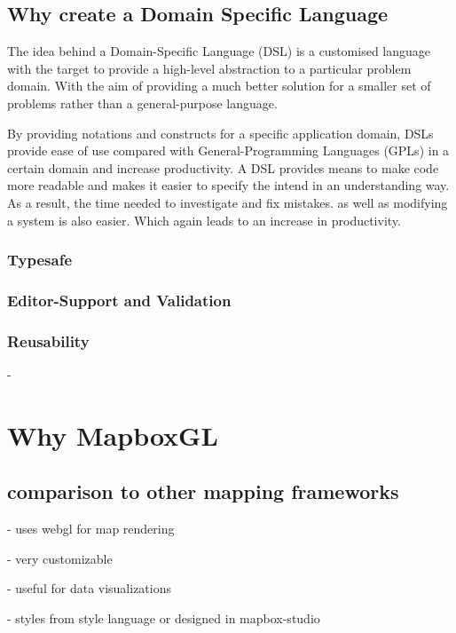 \documentclass[conference]{IEEEtran}
\begin{document}
\subsection{Why create a Domain Specific Language}

The idea behind a Domain-Specific Language (DSL) is a customised language with the target to provide a high-level abstraction to a particular problem domain. With the aim of providing a much better solution
for a smaller set of problems rather than a general-purpose language. \cite{van2000domain}

By providing notations and constructs for a specific application domain, DSLs provide ease of use compared with General-Programming Languages (GPLs) in a certain domain and increase productivity. \cite{10.1145/1118890.1118892} A DSL provides means to make code more readable and makes it easier to specify the intend in an understanding way. As a result, the time needed to investigate and fix mistakes. as well as modifying a system is also easier. Which again leads to an increase in productivity. \cite{fowler2010domain}

\subsubsection{Typesafe}
\subsubsection{Editor-Support and Validation}
\subsubsection{Reusability}

-

\cite{gray2008dsls}
\cite{zdun2010dsl}
\cite{evgrafovanalysis}
\cite{van2000domain}
\cite{vierhauser2015developing}

\section{Why MapboxGL}
\subsection{comparison to other mapping frameworks}
- uses webgl for map rendering

- very customizable

- useful for data visualizations

- styles from style language or designed in mapbox-studio
\end{document}
